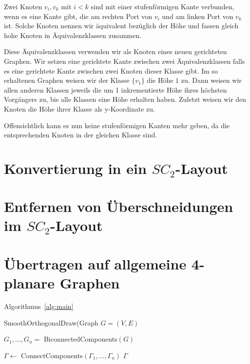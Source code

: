 \documentclass[a4paper]{scrreprt}
\theoremstyle{definition}
\begin{document}
Zwei Knoten $v_i, v_k$ mit $i < k$ sind mit einer stufenförmigen Kante verbunden, wenn es eine Kante gibt, die am rechten Port von $v_i$ und am linken Port von $v_k$ ist. Solche Knoten nennen wir äquivalent bezüglich der Höhe und fassen gleich hohe Knoten in Äquivalenzklassen zusammen.

Diese Äquivalenzklassen verwenden wir als Knoten eines neuen gerichteten Graphen. Wir setzen eine gerichtete Kante zwischen zwei Äquivalenzklassen falls es eine gerichtete Kante zwischen zwei Knoten dieser Klasse gibt. Im so erhaltenen Graphen weisen wir der Klasse $\{v_1\}$ die Höhe $1$ zu. Dann weisen wir allen anderen Klassen jeweils die um 1 inkrementierte Höhe ihres höchsten Vorgängers zu, bis alle Klassen eine Höhe erhalten haben. Zuletzt weisen wir den Knoten die Höhe ihrer Klasse als y-Koordinate zu.

Offensichtlich kann es nun keine stufenförmigen Kanten mehr geben, da die entsprechenden Knoten in der gleichen Klasse sind.

\section{Konvertierung in ein $SC_2$-Layout}



\section{Entfernen von Überschneidungen im $SC_2$-Layout}



\section{Übertragen auf allgemeine 4-planare Graphen}

Algorithmus~\ref{alg:main}

\begin{algorithm}[ht]
  \caption{SmoothOrthogonalDraw(Graph $G = (V,E)$}
  \label{alg:main}
  
  $G_1, \dots, G_n =$ BiconnectedComponents$(G)$ \;
  
  $\Gamma \leftarrow$ ConnectComponents$(\Gamma_1, \dots, \Gamma_n)$ \;
  \Return $\Gamma$
\end{algorithm}
\end{document}
